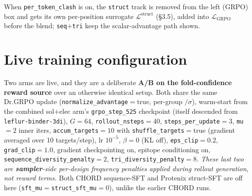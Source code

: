 \documentclass[11pt]{article}
\newcommand{\ttk}[1]{\texttt{\small #1}}
\begin{document}
\begin{center}
\end{center}

When \ttk{per\_token\_clash} is on, the \ttk{struct} track is removed from the left (GRPO) box and
gets its own per-position surrogate $\mathcal L^{\text{struct}}$ (\S3.5), added into
$\mathcal L_{\mathrm{GRPO}}$ before the blend; \ttk{seq}$+$\ttk{tri} keep the scalar-advantage
path shown.

\section{Live training configuration}
Two arms are live, and they are a deliberate \textbf{A/B on the fold-confidence reward source} over
an otherwise identical setup. Both share the same Dr.GRPO update
(\ttk{normalize\_advantage}$=$true, per-group $/\sigma$), warm-start from the combined sol$+$elec
arm's \ttk{grpo\_step\_525} checkpoint (itself descended from \ttk{leflur-binder-3di}), $G{=}64$,
\ttk{rollout\_nsteps}$=40$, \ttk{steps\_per\_update}$=3$, \ttk{mu}$=2$ inner iters,
\ttk{accum\_targets}$=10$ with \ttk{shuffle\_targets}$=$true (gradient averaged over 10 targets/step),
lr $10^{-5}$, $\beta{=}0$ (KL off), \ttk{eps\_clip}$=0.2$, \ttk{grad\_clip}$=1.0$, gradient
checkpointing on, epitope conditioning on, \ttk{sequence\_diversity\_penalty}$=2$,
\ttk{tri\_diversity\_penalty}$=8$. \emph{These last two are \textbf{sampler}-side per-design frequency
penalties applied during rollout generation, not reward terms.} Both CHORD sequence-SFT and Protenix
struct-SFT are off here (\ttk{sft\_mu}$=$\ttk{struct\_sft\_mu}$=0$), unlike the earlier CHORD runs.
\end{document}
